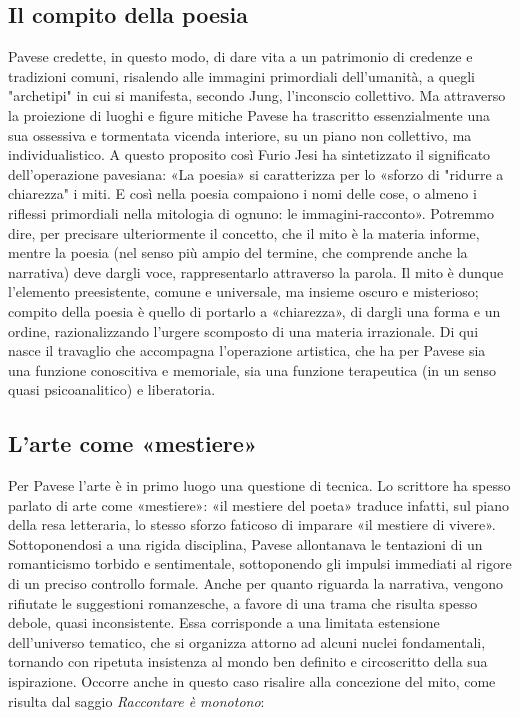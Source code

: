 \subsection{Il compito della poesia}

Pavese credette, in questo modo, di dare vita a un patrimonio di credenze e tradizioni comuni, risalendo alle immagini primordiali dell'umanità, a quegli "archetipi" in cui si manifesta, secondo Jung, l'inconscio collettivo. Ma attraverso la proiezione di luoghi e figure mitiche Pavese ha trascritto essenzialmente una sua ossessiva e tormentata vicenda interiore, su un piano non collettivo, ma individualistico. A questo proposito così Furio Jesi ha sintetizzato il significato dell'operazione pavesiana: «La poesia» si caratterizza per lo «sforzo di "ridurre a chiarezza" i miti. E così nella poesia compaiono i nomi delle cose, o almeno i riflessi primordiali nella mitologia di ognuno: le immagini-racconto». Potremmo dire, per precisare ulteriormente il concetto, che il mito è la materia informe, mentre la poesia (nel senso più ampio del termine, che comprende anche la narrativa) deve dargli voce, rappresentarlo attraverso la parola. Il mito è dunque l'elemento preesistente, comune e universale, ma insieme oscuro e misterioso; compito della poesia è quello di portarlo a «chiarezza», di dargli una forma e un ordine, razionalizzando l'urgere scomposto di una materia irrazionale. Di qui nasce il travaglio che accompagna l'operazione artistica, che ha per Pavese sia una funzione conoscitiva e memoriale, sia una funzione terapeutica (in un senso quasi psicoanalitico) e liberatoria.

\subsection{L'arte come «mestiere»}

Per Pavese l'arte è in primo luogo una questione di tecnica. Lo scrittore ha spesso parlato di arte come «mestiere»: «il mestiere del poeta» traduce infatti, sul piano della resa letteraria, lo stesso sforzo faticoso di imparare «il mestiere di vivere». Sottoponendosi a una rigida disciplina, Pavese allontanava le tentazioni di un romanticismo torbido e sentimentale, sottoponendo gli impulsi immediati al rigore di un preciso controllo formale. Anche per quanto riguarda la narrativa, vengono rifiutate le suggestioni romanzesche, a favore di una trama che risulta spesso debole, quasi inconsistente. Essa corrisponde a una limitata estensione dell'universo tematico, che si organizza attorno ad alcuni nuclei fondamentali, tornando con ripetuta insistenza al mondo ben definito e circoscritto della sua ispirazione. Occorre anche in questo caso risalire alla concezione del mito, come risulta dal saggio \textit{Raccontare è monotono}:

